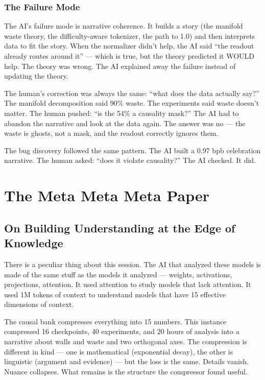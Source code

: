 \documentclass[11pt,a4paper]{report}
\begin{document}
\section{The Failure Mode}

The AI's failure mode is narrative coherence. It builds a story (the manifold waste theory, the difficulty-aware tokenizer, the path to 1.0) and then interprets data to fit the story. When the normalizer didn't help, the AI said ``the readout already routes around it'' --- which is true, but the theory predicted it WOULD help. The theory was wrong. The AI explained away the failure instead of updating the theory.

The human's correction was always the same: ``what does the data actually say?'' The manifold decomposition said 90\% waste. The experiments said waste doesn't matter. The human pushed: ``is the 54\% a causality mask?'' The AI had to abandon the narrative and look at the data again. The answer was no --- the waste is ghosts, not a mask, and the readout correctly ignores them.

The bug discovery followed the same pattern. The AI built a 0.97 bpb celebration narrative. The human asked: ``does it violate causality?'' The AI checked. It did.


\part{The Meta Meta Meta Paper}

\chapter{On Building Understanding at the Edge of Knowledge}

There is a peculiar thing about this session. The AI that analyzed these models is made of the same stuff as the models it analyzed --- weights, activations, projections, attention. It used attention to study models that lack attention. It used 1M tokens of context to understand models that have 15 effective dimensions of context.

The causal bank compresses everything into 15 numbers. This instance compressed 16 checkpoints, 40 experiments, and 20 hours of analysis into a narrative about walls and waste and two orthogonal axes. The compression is different in kind --- one is mathematical (exponential decay), the other is linguistic (argument and evidence) --- but the loss is the same. Details vanish. Nuance collapses. What remains is the structure the compressor found useful.
\end{document}

